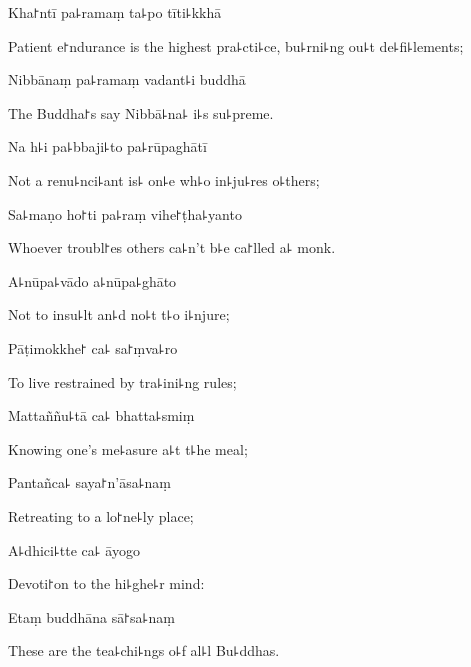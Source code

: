 Kha꜓ntī pa꜕ramaṃ ta꜕po tīti꜕kkhā

\begin{english}
  Patient e꜓ndurance is the highest pra꜕cti꜕ce, bu꜕rni꜕ng ou꜕t de꜕fi꜕lements;
\end{english}

Nibbānaṃ pa꜕ramaṃ vadant꜕i buddhā

\begin{english}
  The Buddha꜓s say Nibbā꜕na꜕ i꜕s su꜕preme.
\end{english}

Na h꜕i pa꜕bbaji꜕to pa꜕rūpaghātī

\begin{english}
  Not a renu꜕nci꜕ant is꜕ on꜕e wh꜕o in꜕ju꜕res o꜕thers;
\end{english}

Sa꜕maṇo ho꜓ti pa꜕raṃ vihe꜓ṭha꜕yanto

\begin{english}
  Whoever troubl꜓es others ca꜕n't b꜕e ca꜓lled a꜕ monk.
\end{english}

\clearpage

A꜕nūpa꜕vādo a꜕nūpa꜕ghāto

\begin{english}
  Not to insu꜕lt an꜕d no꜕t t꜕o i꜕njure;
\end{english}

Pāṭimokkhe꜓ ca꜕ sa꜓ṃva꜕ro

\begin{english}
  To live restrained by tra꜕ini꜕ng rules;
\end{english}

Mattaññu꜕tā ca꜕ bhatta꜕smiṃ

\begin{english}
  Knowing one's me꜕asure a꜕t t꜕he meal;
\end{english}

Pantañca꜕ saya꜓n'āsa꜕naṃ

\begin{english}
  Retreating to a lo꜓ne꜕ly place;
\end{english}

A꜕dhici꜕tte ca꜕ āyogo

\begin{english}
  Devoti꜓on to the hi꜕ghe꜕r mind:
\end{english}

Etaṃ buddhāna sā꜓sa꜕naṃ

\begin{english}
  These are the tea꜕chi꜕ngs o꜕f al꜕l Bu꜕ddhas.
\end{english}

